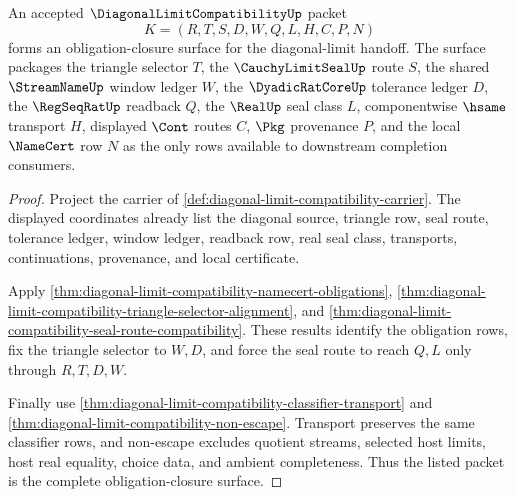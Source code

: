 \begin{theorem}
\label{thm:diagonal-limit-compatibility-obligation-closure-package}
An accepted $\DiagonalLimitCompatibilityUp$ packet
$$
K=(R,T,S,D,W,Q,L,H,C,P,N)
$$
forms an obligation-closure surface for the diagonal-limit handoff. The surface packages the triangle selector $T$, the $\CauchyLimitSealUp$ route $S$, the shared $\StreamNameUp$ window ledger $W$, the $\DyadicRatCoreUp$ tolerance ledger $D$, the $\RegSeqRatUp$ readback $Q$, the $\RealUp$ seal class $L$, componentwise $\hsame$ transport $H$, displayed $\Cont$ routes $C$, $\Pkg$ provenance $P$, and the local $\NameCert$ row $N$ as the only rows available to downstream completion consumers.
\end{theorem}
\begin{proof}
Project the carrier of \autoref{def:diagonal-limit-compatibility-carrier}. The displayed coordinates already list the diagonal source, triangle row, seal route, tolerance ledger, window ledger, readback row, real seal class, transports, continuations, provenance, and local certificate.

Apply \autoref{thm:diagonal-limit-compatibility-namecert-obligations}, \autoref{thm:diagonal-limit-compatibility-triangle-selector-alignment}, and \autoref{thm:diagonal-limit-compatibility-seal-route-compatibility}. These results identify the obligation rows, fix the triangle selector to $W,D$, and force the seal route to reach $Q,L$ only through $R,T,D,W$.

Finally use \autoref{thm:diagonal-limit-compatibility-classifier-transport} and \autoref{thm:diagonal-limit-compatibility-non-escape}. Transport preserves the same classifier rows, and non-escape excludes quotient streams, selected host limits, host real equality, choice data, and ambient completeness. Thus the listed packet is the complete obligation-closure surface.
\end{proof}

